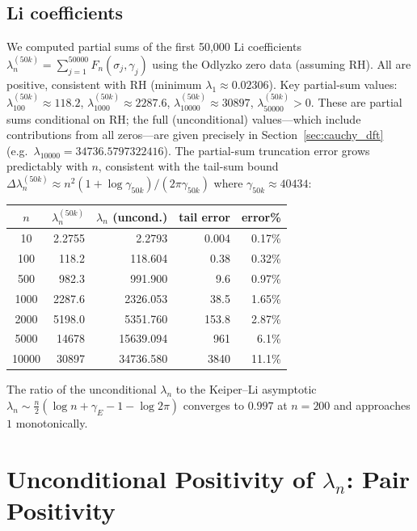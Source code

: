 \documentclass[11pt]{article}
\begin{document}
\subsection{Li coefficients}

We computed partial sums of the first 50{,}000 Li coefficients $\lambda_n^{(50k)}
= \sum_{j=1}^{50000} F_n(\sigma_j,\gamma_j)$ using the Odlyzko zero data (assuming RH).
All are positive, consistent with RH (minimum $\lambda_1 \approx 0.02306$).
Key partial-sum values: $\lambda_{100}^{(50k)} \approx 118.2$,
$\lambda_{1000}^{(50k)} \approx 2287.6$,
$\lambda_{10000}^{(50k)} \approx 30897$, $\lambda_{50000}^{(50k)} > 0$.
These are partial sums conditional on RH; the full (unconditional) values---which include
contributions from all zeros---are given precisely in Section~\ref{sec:cauchy_dft}
(e.g.\ $\lambda_{10000} = 34736.5797322416$).
The partial-sum truncation error grows predictably with $n$, consistent with the
tail-sum bound $\Delta\lambda_n^{(50k)} \approx n^2(1+\log\gamma_{50k})/(2\pi\gamma_{50k})$
where $\gamma_{50k} \approx 40434$:

\begin{center}
\begin{tabular}{crrrr}
\toprule
$n$ & $\lambda_n^{(50k)}$ & $\lambda_n$ (uncond.) & tail error & error\% \\
\midrule
10     &  2.2755     &  2.2793     & 0.004   & 0.17\% \\
100    & 118.2       & 118.604     & 0.38    & 0.32\% \\
500    & 982.3       & 991.900     & 9.6     & 0.97\% \\
1000   & 2287.6      & 2326.053    & 38.5    & 1.65\% \\
2000   & 5198.0      & 5351.760    & 153.8   & 2.87\% \\
5000   & 14678       & 15639.094   & 961     & 6.1\%  \\
10000  & 30897       & 34736.580   & 3840    & 11.1\% \\
\bottomrule
\end{tabular}
\end{center}

The ratio of the unconditional $\lambda_n$ to the Keiper--Li asymptotic
$\lambda_n \sim \frac{n}{2}(\log n + \gamma_E - 1 - \log 2\pi)$
converges to $0.997$ at $n = 200$ and approaches $1$ monotonically.

\section{Unconditional Positivity of $\lambda_n$: Pair Positivity}
\label{sec:pair_pos}
\end{document}
